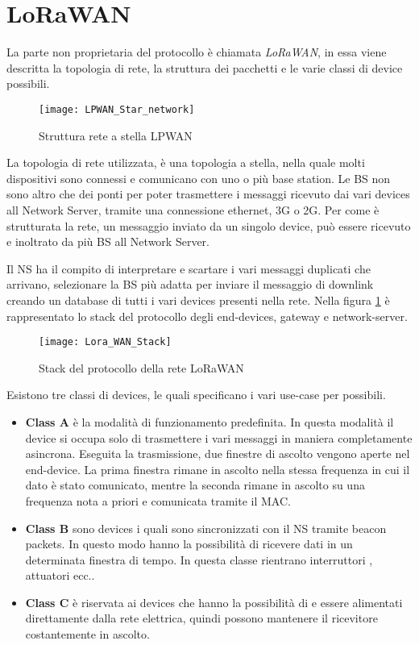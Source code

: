 \section{LoRaWAN}
La parte non proprietaria del protocollo è chiamata \emph{LoRaWAN}, in essa
viene descritta la topologia di rete, la struttura dei pacchetti e le varie
classi di device possibili.

\begin{figure}[h]
\centering 
\texttt{[image: LPWAN\_Star\_network]}
\caption{Struttura rete a stella LPWAN}
\end{figure}

La topologia di rete utilizzata, è una topologia a stella, nella quale molti
dispositivi sono connessi e comunicano con uno o più base station. Le BS non
sono altro che dei ponti per poter trasmettere i messaggi ricevuto dai vari
devices all Network Server, tramite una connessione ethernet, 3G o 2G. 
Per come è strutturata la rete, un messaggio inviato
da un singolo device, può essere ricevuto e inoltrato da più BS all Network
Server.

Il NS ha il compito di interpretare e scartare i vari messaggi duplicati che
arrivano, selezionare la BS più adatta per inviare il messaggio di downlink
creando un database di tutti i vari devices presenti nella rete. Nella figura
\ref{fig:stack_lora} è rappresentato lo stack del protocollo degli end-devices,
gateway  e network-server. 

\begin{figure}[h]
\centering 
\texttt{[image: Lora\_WAN\_Stack]}
\caption{Stack del protocollo della rete LoRaWAN}
\label{fig:stack_lora}
\end{figure}

Esistono tre classi di devices, le quali specificano i vari use-case per
possibili.

\begin{itemize}
\item \textbf{Class A} è la modalità di funzionamento predefinita. In questa
modalità il device si occupa solo di trasmettere i vari messaggi in maniera
completamente asincrona. Eseguita la trasmissione, due finestre di ascolto
vengono aperte nel end-device. La prima finestra rimane in ascolto nella stessa
frequenza in cui il dato è stato comunicato, mentre la seconda rimane in ascolto
su una frequenza nota a priori e comunicata tramite il MAC.
\item \textbf{Class B} sono devices i quali sono sincronizzati con il NS tramite
beacon packets. In questo modo hanno la possibilità di ricevere dati in un
determinata finestra di tempo. In questa classe rientrano interruttori ,
attuatori ecc..
\item \textbf{Class C} è riservata ai devices che hanno la possibilità di e
essere alimentati direttamente dalla rete elettrica, quindi possono mantenere il
ricevitore costantemente in ascolto.
\end{itemize}

